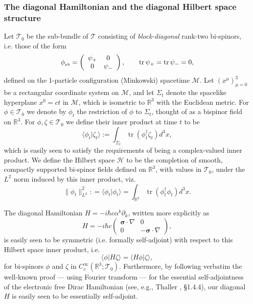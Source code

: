\documentclass[11pt]{article}
\theoremstyle{definition}
\DeclareMathOperator{\tr}{tr}
\numberwithin{equation}{section}
\newcommand{\beq}{\begin{equation}}
\newcommand{\eeq}{\end{equation}}
\newcommand{\p}{\partial}
\newcommand{\cH}{{\mathcal H}}
\newcommand{\cM}{{\mathcal M}}
\newcommand{\cT}{\mathcal{T}}
\newcommand{\siV}{\boldsymbol{\sigma}}
\newcommand{\phiPH}{{\phi_{\mbox{\rm\tiny ph}}}}
\newcommand{\Rset}{{\mathbb R}}
\newcommand{\ze}{\zeta}
\newcommand{\al}{\alpha}
\newcommand{\Si}{\Sigma}
\newcommand{\nab}{\nabla}
\begin{document}
\subsubsection{The diagonal Hamiltonian and the diagonal  Hilbert space structure}
 Let $\cT_0$ be the sub-bundle of  $\cT$ consisting of {\em block-diagonal} rank-two bi-spinors, i.e. those of the form
\beq
\phiPH = \left(\begin{array}{cc} \psi_+ & 0 \\ 0 & \psi_- \end{array}\right),\qquad \tr \psi_+ = \tr \psi_- = 0,
\eeq
defined on the 1-particle configuration (Minkowski) spacetime $\cM$. 
 Let $(x^\mu)_{\mu=0}^3$ be a rectangular coordinate system on $\cM$, and let $\Si_t$ denote the spacelike hyperplane $x^0 = ct$ 
in $\cM$, which is isometric to $\Rset^3$ with the Euclidean metric.
 For $\phi \in \cT_0$ we denote by $\phi_t$ the restriction of $\phi$ to $\Si_t$, thought of as a bispinor field on $\Rset^3$.
   For $\phi,\ze \in \cT_0$ we define their inner product at time $t$ to be
\beq\label{def:innerprod}
\langle \phi_t | \ze_t \rangle := \int_{\Si_t} \tr\left( \phi_t^\dag \ze_t \right) d^3x,
\eeq
which is easily seen to satisfy the requirements of being a complex-valued inner product. 
 We define the Hilbert space $\cH$ to be the completion of smooth, compactly supported bi-spinor fields defined on $\Rset^3$, 
with values in $\cT_0$, under the $L^2$ norm induced by this inner product, viz.
\beq
\|\phi_t\|_{L^2}^2 : = \langle\phi_t | \phi_t\rangle = \int_{\Rset^3} \tr\left( \phi_t^\dag\phi_t \right) d^3x.
\eeq

 The diagonal Hamiltonian $H = -i\hbar c\al^k\p_k$, written more explicitly as
\beq 
\label{DIRACphotonHAMILTONIAN}
H = -i\hbar c\begin{pmatrix} \siV\cdot\nab  & 0 \\
                                        0 & - \siV\cdot\nab
\end{pmatrix},
\eeq
is easily seen to be symmetric (i.e. formally self-adjoint) with respect to this Hilbert space inner product, i.e.
\beq 
\langle \phi | H\zeta \rangle = \langle H\phi| \zeta \rangle,
\eeq
for bi-spinors $\phi$ and $\zeta$ in $C^\infty_c(\Rset^3;\cT_0)$.
 Furthermore, by following verbatim the well-known proof --- using Fourier 
transform --- for the essential self-adjointness of the electronic free Dirac Hamiltonian (see, e.g., Thaller \cite{ThallerBOOK}, \S1.4.4),
our diagonal $H$ is easily seen to be essentially self-adjoint.
\end{document}
